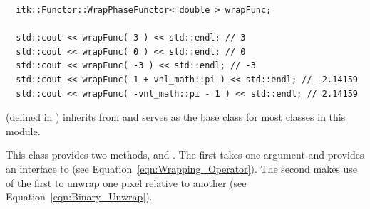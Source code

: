 \small
\begin{verbatim}
  itk::Functor::WrapPhaseFunctor< double > wrapFunc;

  std::cout << wrapFunc( 3 ) << std::endl; // 3
  std::cout << wrapFunc( 0 ) << std::endl; // 0
  std::cout << wrapFunc( -3 ) << std::endl; // -3
  std::cout << wrapFunc( 1 + vnl_math::pi ) << std::endl; // -2.14159
  std::cout << wrapFunc( -vnl_math::pi - 1 ) << std::endl; // 2.14159
\end{verbatim}
\normalsize

 (defined in ) inherits from  and serves as the base class for most classes in this module.

This class provides two methods,  and .  The first takes one argument and provides an interface to  (see Equation~\ref{eqn:Wrapping_Operator}).  The second makes use of the first to unwrap one pixel relative to another (see Equation~\ref{eqn:Binary_Unwrap}).

